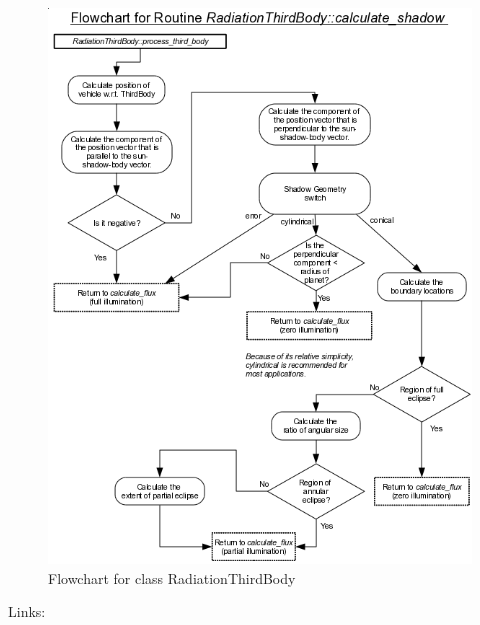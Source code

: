 \begin{figure}[!ht]
  \includegraphics[width = 5.8 in]{figs/flowchart/flow_calculate_shadow.png}
  \caption{Flowchart for class RadiationThirdBody }
  \label{fig:flow_calculate_shadow}
\end{figure}
Links: \newline
{}\newline
\clearpage

